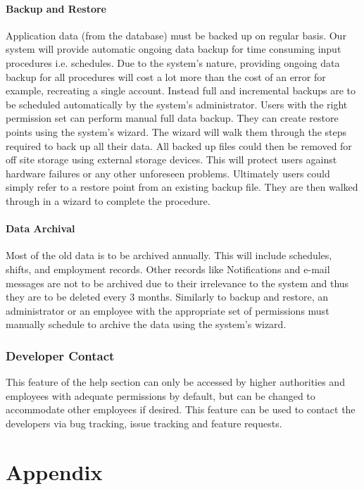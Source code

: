 \documentclass[letterpaper,12pt]{report}
\begin{document}
\subsection{Backup and Restore}
  Application data (from the database) must be backed up on regular basis. Our system will provide automatic ongoing data backup for time consuming input procedures i.e. schedules. Due to the system’s nature, providing ongoing data backup for all procedures will cost a lot more than the cost of an error for example, recreating a single account.  Instead full and incremental backups are to be scheduled automatically by the system’s administrator. Users with the right permission set can perform manual full data backup. They can create restore points using the system's wizard. The wizard will walk them through the steps required to back up all their data. All backed up files could then be removed for off site storage using external storage devices. This will protect users against hardware failures or any other unforeseen problems. Ultimately users could simply refer to a restore point from an existing backup file. They are then walked through in a wizard to complete the procedure. 

\subsection{Data Archival}
  Most of the old data is to be archived annually. This will include schedules, shifts, and employment records.
Other records like Notifications and e-mail messages are not to be archived due to their irrelevance to the system and thus they are to be deleted every 3 months. 
Similarly to backup and restore, an administrator or an employee with the appropriate set of permissions must manually schedule to archive the data using the system’s wizard.


\section{Developer Contact}
	This feature of the help section can only be accessed by higher authorities and employees with adequate permissions by default, but can be changed to accommodate other employees if desired. This feature can be used to contact the developers via bug tracking, issue tracking and feature requests. 

\appendix
\part{Appendix}
\end{document}
